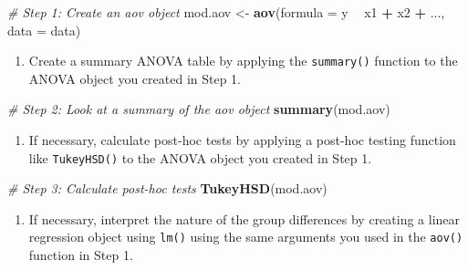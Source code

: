 \documentclass[]{book}
\newenvironment{Shaded}{\begin{snugshade}}{\end{snugshade}}
\newcommand{\KeywordTok}[1]{\textcolor[rgb]{0.13,0.29,0.53}{\textbf{#1}}}
\newcommand{\DataTypeTok}[1]{\textcolor[rgb]{0.13,0.29,0.53}{#1}}
\newcommand{\StringTok}[1]{\textcolor[rgb]{0.31,0.60,0.02}{#1}}
\newcommand{\CommentTok}[1]{\textcolor[rgb]{0.56,0.35,0.01}{\textit{#1}}}
\newcommand{\OperatorTok}[1]{\textcolor[rgb]{0.81,0.36,0.00}{\textbf{#1}}}
\newcommand{\NormalTok}[1]{#1}
\providecommand{\tightlist}{%
  \setlength{\itemsep}{0pt}\setlength{\parskip}{0pt}}
\theoremstyle{definition}
\theoremstyle{definition}
\theoremstyle{remark}
\begin{document}
\begin{Shaded}
\begin{Highlighting}[]
\CommentTok{# Step 1: Create an aov object}
\NormalTok{mod.aov <-}\StringTok{ }\KeywordTok{aov}\NormalTok{(}\DataTypeTok{formula =}\NormalTok{ y }\OperatorTok{~}\StringTok{ }\NormalTok{x1 }\OperatorTok{+}\StringTok{ }\NormalTok{x2 }\OperatorTok{+}\StringTok{ }\NormalTok{...,}
               \DataTypeTok{data =}\NormalTok{ data)}
\end{Highlighting}
\end{Shaded}

\begin{enumerate}
\def\labelenumi{\arabic{enumi}.}
\setcounter{enumi}{1}
\tightlist
\item
  Create a summary ANOVA table by applying the \texttt{summary()}
  function to the ANOVA object you created in Step 1.
\end{enumerate}

\begin{Shaded}
\begin{Highlighting}[]
\CommentTok{# Step 2: Look at a summary of the aov object}
\KeywordTok{summary}\NormalTok{(mod.aov)}
\end{Highlighting}
\end{Shaded}

\begin{enumerate}
\def\labelenumi{\arabic{enumi}.}
\setcounter{enumi}{2}
\tightlist
\item
  If necessary, calculate post-hoc tests by applying a post-hoc testing
  function like \texttt{TukeyHSD()} to the ANOVA object you created in
  Step 1.
\end{enumerate}

\begin{Shaded}
\begin{Highlighting}[]
\CommentTok{# Step 3: Calculate post-hoc tests}
\KeywordTok{TukeyHSD}\NormalTok{(mod.aov)}
\end{Highlighting}
\end{Shaded}

\begin{enumerate}
\def\labelenumi{\arabic{enumi}.}
\setcounter{enumi}{3}
\tightlist
\item
  If necessary, interpret the nature of the group differences by
  creating a linear regression object using \texttt{lm()} using the same
  arguments you used in the \texttt{aov()} function in Step 1.
\end{enumerate}
\end{document}
